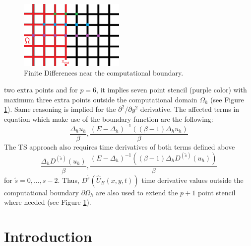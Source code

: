 \documentclass[11pt,a4paper,twoside]{article}
\begin{document}
\begin{figure}[ht]%
\begin{center}
\includegraphics[width=2in]{Pictures/BoundaryPicture.png}
	\caption{Finite Differences near the computational boundary.}
	\label{fig:BoundaryFD}
  \end{center}
\end{figure}
two extra points and for $p=6$, it implies seven point stencil (purple color) with maximum three extra points outside the computational domain $\Omega_h$ (see Figure \ref{fig:BoundaryFD}). Same reasoning is implied for the $\partial^2 / \partial y^2$ derivative. The affected terms in equation  which make use of the boundary function  are the following:
\begin{equation*}
\frac{ \Delta_h u_h}{\beta}, \frac{ (E - \Delta_h)^{-1} ( (\beta -1)\Delta_h u_h) }{\beta}
\end{equation*}
The TS approach also requires time derivatives of both terms defined above
\begin{equation*}
\frac{ \Delta_h D^{(\tilde s)} (u_h)}{\beta}, \frac{ (E - \Delta_h)^{-1} ( (\beta -1)\Delta_h D^{(\tilde s)}(u_h) ) }{\beta}
\end{equation*}
for $\tilde s = 0, ..., s-2$.  Thus, $D^{\tilde s}(\widehat U_B(x , y, t))$  time derivative values outside the computational boundary $\partial \Omega_h$ are also used to extend the $p+1$ point stencil where needed (see Figure  \ref{fig:BoundaryFD}).


\section{Introduction}
\end{document}
